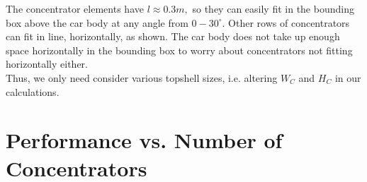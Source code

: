 \documentclass[reqno, 11pt, final]{article}
\begin{document}
The concentrator elements have $l \approx 0.3 m,$ so they can easily fit in the bounding box above the car body at any angle from $0-30^{\circ}$. Other rows of concentrators can fit in line, horizontally, as shown. The car body does not take up enough space horizontally in the bounding box to worry about concentrators not fitting horizontally either. \\

Thus, we only need consider various topshell sizes, i.e. altering $W_C$ and $H_C$ in our calculations.

\newpage
\section{Performance vs. Number of Concentrators}
\end{document}
